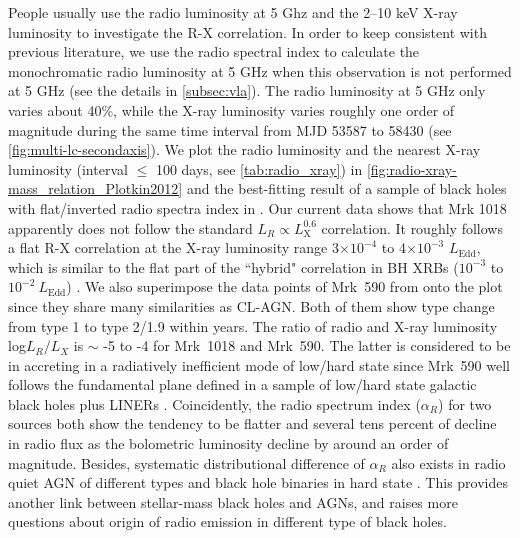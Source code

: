 \documentclass[twocolumn]{aastex63}
\begin{document}
People usually use the radio luminosity at 5 Ghz and the 2--10 keV X-ray luminosity to investigate the R-X correlation. In order to keep consistent with previous literature, we use the radio spectral index to calculate the monochromatic radio luminosity at 5 GHz when this observation is not performed at 5 GHz (see the details in \autoref{subsec:vla}). The radio luminosity at 5 GHz only varies about 40\%, while the X-ray luminosity varies roughly one order of magnitude during the same time interval from MJD 53587 to 58430 (see \autoref{fig:multi-lc-secondaxis}). We plot the radio luminosity and the nearest X-ray luminosity (interval $\le$ 100 days, see \autoref{tab:radio_xray}) in \autoref{fig:radio-xray-mass_relation_Plotkin2012} and the best-fitting result of a sample of black holes with flat/inverted radio spectra index in \citet{2012MNRAS.419..267P}. Our current data shows that Mrk 1018 apparently does not follow the standard $L_{R}\propto L_\mathrm{X}^{0.6}$ correlation. It roughly follows a flat R-X correlation at the X-ray luminosity range 3$\times 10^{-4}$ to 4$\times 10^{-3}$ $L_\mathrm{Edd}$, which is similar to the flat part of the ``hybrid" correlation in BH XRBs ($10^{-3}$ to $10^{-2}~L_\mathrm{Edd}$) \citep[see e.g. ][]{2018MNRAS.473.4122E,2020ApJ...891...31X}. We also superimpose the data points of Mrk~590 from \citet[][]{2016MNRAS.460..304K} onto the plot since they share many similarities as CL-AGN. Both of them show type change from type 1 to type 2/1.9 within years. The ratio of radio and X-ray luminosity log$L_R/L_X$ is $\sim$ -5 to -4 for Mrk~1018 and Mrk~590. The latter is considered to be in accreting in a radiatively inefficient mode of low/hard state since Mrk~590 well follows the fundamental plane defined in a sample of low/hard state galactic black holes plus LINERs \citep[see ][]{2016MNRAS.460..304K}. Coincidently, the radio spectrum index ($\alpha_R$) for two sources both show the tendency to be flatter and several tens percent of decline in radio flux as the bolometric luminosity decline by around an order of magnitude. Besides, systematic distributional difference of $\alpha_R$ also exists in radio quiet AGN of different types \citep[e.g.][]{2019MNRAS.485.3185C} and black hole binaries in hard state \citep[see][]{2018MNRAS.473.4122E}. This provides another link between stellar-mass black holes and AGNs, and raises more questions about origin of radio emission in different type of black holes. 
\end{document}
